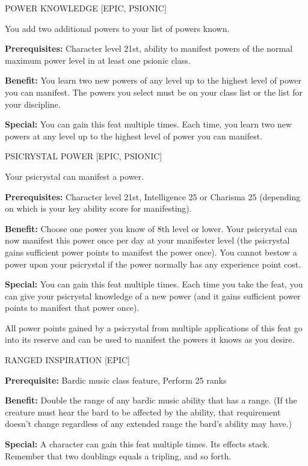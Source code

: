 \documentclass{article}
\begin{document}
\vspace{12pt}
POWER KNOWLEDGE [EPIC, PSIONIC]

You add two additional powers to your list of powers known.

\textbf{Prerequisites: }Character level 21st, ability to manifest powers of the 
normal maximum power level in at least one psionic class.

\textbf{Benefit:} You learn two new powers of any level up to the highest level 
of power you can manifest. The powers you select must be on your class list or 
the list for your discipline.

\textbf{Special:} You can gain this feat multiple times. Each time, you learn two 
new powers at any level up to the highest level of power you can manifest.

\vspace{12pt}
PSICRYSTAL POWER [EPIC, PSIONIC]

Your psicrystal can manifest a power.

\textbf{Prerequisites:} Character level 21st, Intelligence 25 or Charisma 25 (depending 
on which is your key ability score for manifesting).

\textbf{Benefit:} Choose one power you know of 8th level or lower. Your psicrystal 
can now manifest this power once per day at your manifester level (the psicrystal 
gains sufficient power points to manifest the power once). You cannot bestow a 
power upon your psicrystal if the power normally has any experience point cost.

\textbf{Special: }You can gain this feat multiple times. Each time you take the 
feat, you can give your psicrystal knowledge of a new power (and it gains sufficient 
power points to manifest that power once).

All power points gained by a psicrystal from multiple applications of this feat 
go into its reserve and can be used to manifest the powers it knows as you desire.

\vspace{12pt}
RANGED INSPIRATION [EPIC] 

\textbf{Prerequisite:} Bardic music class feature, Perform 25 ranks 

\textbf{Benefit:} Double the range of any bardic music ability that has a range. 
(If the creature must hear the bard to be affected by the ability, that requirement 
doesn't change regardless of any extended range the bard's ability may have.) 

\textbf{Special:} A character can gain this feat multiple times. Its effects stack. 
Remember that two doublings equals a tripling, and so forth.
\end{document}
